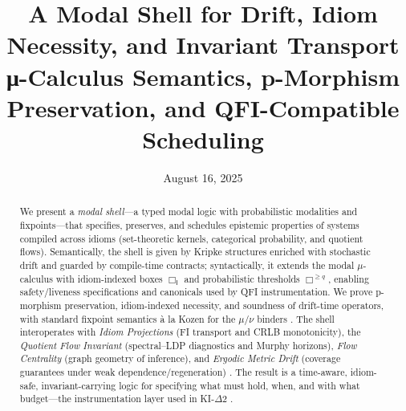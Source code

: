 \documentclass[11pt]{article}
\title{A Modal Shell for Drift, Idiom Necessity, and Invariant Transport\\
\large μ-Calculus Semantics, p-Morphism Preservation, and QFI-Compatible Scheduling}
\author{}
\date{August 16, 2025}
\theoremstyle{plain}
\theoremstyle{definition}
\theoremstyle{remark}
\newcommand{\1}{\mathbbm{1}}
\begin{document}
\maketitle

\begin{abstract}
We present a \emph{modal shell}---a typed modal logic with probabilistic modalities and fixpoints---that specifies, preserves, and schedules epistemic properties of systems compiled across idioms (set-theoretic kernels, categorical probability, and quotient flows). Semantically, the shell is given by Kripke structures enriched with stochastic drift and guarded by compile-time contracts; syntactically, it extends the modal $\mu$-calculus with idiom-indexed boxes $\Box_{\mathsf{I}}$ and probabilistic thresholds $\Box^{\geq q}$, enabling safety/liveness specifications and canonicals used by QFI instrumentation. We prove p-morphism preservation, idiom-indexed necessity, and soundness of drift-time operators, with standard fixpoint semantics à la Kozen for the $\mu$/$\nu$ binders \parencite{Kozen1983,BlackburnRijkeVenema2001,Stirling2001}. The shell interoperates with \emph{Idiom Projections} (FI transport and CRLB monotonicity), the \emph{Quotient Flow Invariant} (spectral--LDP diagnostics and Murphy horizons), \emph{Flow Centrality} (graph geometry of inference), and \emph{Ergodic Metric Drift} (coverage guarantees under weak dependence/regeneration) \parencite{elliott2025idiom,elliott2025qfi,elliott2025flow,elliott2025drift,DemboZeitouni1998,MeynTweedie2009}. The result is a time-aware, idiom-safe, invariant-carrying logic for specifying what must hold, when, and with what budget---the instrumentation layer used in KI-\(\Delta\)2 \parencite{elliott2025ki}.
\end{abstract}
\end{document}
